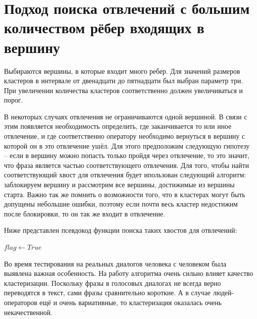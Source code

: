 \documentclass[times,specification,annotation]{itmo-student-thesis}
\begin{document}
	\label{algorithms}
	\section{Подход поиска отвлечений с большим количеством рёбер входящих в вершину}
	Выбираются вершины, в которые входит много ребер. Для значений размеров кластеров в интервале от двенадцати до пятнадцати был выбран параметр три. При увеличении количества кластеров соответственно должен увеличиваться и порог.
	
	В некоторых случаях отвлечения не ограничиваются одной вершиной. В связи с этим появляется необходимость определить, где заканчивается то или иное отвлечение, и где соответственно оператору необходимо вернуться в вершину с которой он в это отвлечение ушёл. Для этого предположим следующую гипотезу -- если в вершину можно попасть только пройдя через отвлечение, то это значит, что фраза является частью соответствующего отвлечения. 
	Для того, чтобы найти соответствующий хвост для отвлечения будет ипользован следующий алгоритм: заблокируем вершину и рассмотрим все вершины, достижимые из вершины старта. Важно так же помнить о возможности того, что в кластерах могут быть допущены небольшие ошибки, поэтому если почти весь кластер недостижим после блокировки, то он так же входит в отвлечение.
	
	Ниже представлен псевдокод функции поиска таких хвостов для отвлечений:
	
	\begin{algorithmic}
		\State $flag\gets True$
		\Else
		\EndIf
		\EndFor
		\EndFor
		\Else
		\EndIf
		\EndIf
		\EndFor
		\State {}
		\EndFunction
	\end{algorithmic}	
	
	Во время тестирования на реальных диалогов человека с человеком была выявлена важная особенность. На работу алгоритма очень сильно влияет качество кластеризации. Поскольку фразы в голосовых диалогах не всегда верно переводятся в текст, сами фразы сравнительно короткие. А в случае людей-операторов ещё и очень вариативные, то кластеризация оказалась очень некачественной.
	
\end{document}
